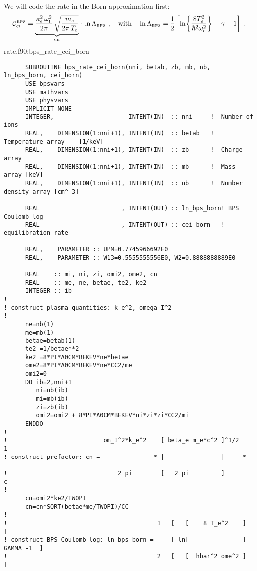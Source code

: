 \documentclass[preprint,12pt,eqsecnum,nofootinbib,amsmath,amssymb]{revtex4}
\newcommand{\smI}{{\rm\scriptscriptstyle I}}
\newcommand{\smBPS}{{\rm\scriptscriptstyle BPS}}
\begin{document}
We will code the rate in the Born approximation first:
\begin{eqnarray}
  {\cal C}_{e\smI}^\smBPS
  = 
  \underbrace{
  \frac{\kappa_e^2\,\omega_\smI^2}{2\pi}\, 
  \sqrt{\frac{m_e}{2\pi\, T_e}}
  }_{\rm cn} \,\cdot\,  \ln\Lambda_\smBPS \ ,
  ~~~\text{with}~~~
  \ln\Lambda_\smBPS
  =
  \frac{1}{2}\left[\ln\!\left\{\frac{8 T_e^2}{\hbar^2 \omega_e^2}
  \right\} - \gamma - 1 \right] \ .
\label{bpsrate_again}
\end{eqnarray}
\vskip0.1cm 
\noindent
rate.f90:bps\_rate\_cei\_born
{
\baselineskip 10pt
\begin{verbatim}
      SUBROUTINE bps_rate_cei_born(nni, betab, zb, mb, nb, ln_bps_born, cei_born)
      USE bpsvars
      USE mathvars
      USE physvars
      IMPLICIT NONE
      INTEGER,                     INTENT(IN)  :: nni     !  Number of ions
      REAL,    DIMENSION(1:nni+1), INTENT(IN)  :: betab   !  Temperature array    [1/keV]
      REAL,    DIMENSION(1:nni+1), INTENT(IN)  :: zb      !  Charge array 
      REAL,    DIMENSION(1:nni+1), INTENT(IN)  :: mb      !  Mass array [keV]
      REAL,    DIMENSION(1:nni+1), INTENT(IN)  :: nb      !  Number density array [cm^-3]

      REAL                       , INTENT(OUT) :: ln_bps_born! BPS Coulomb log 
      REAL                       , INTENT(OUT) :: cei_born   ! equilibration rate

      REAL,    PARAMETER :: UPM=0.7745966692E0
      REAL,    PARAMETER :: W13=0.5555555556E0, W2=0.8888888889E0

      REAL    :: mi, ni, zi, omi2, ome2, cn
      REAL    :: me, ne, betae, te2, ke2
      INTEGER :: ib
!
! construct plasma quantities: k_e^2, omega_I^2
!
      ne=nb(1)
      me=mb(1)
      betae=betab(1)
      te2 =1/betae**2
      ke2 =8*PI*A0CM*BEKEV*ne*betae
      ome2=8*PI*A0CM*BEKEV*ne*CC2/me
      omi2=0
      DO ib=2,nni+1
         ni=nb(ib)
         mi=mb(ib)
         zi=zb(ib)
         omi2=omi2 + 8*PI*A0CM*BEKEV*ni*zi*zi*CC2/mi
      ENDDO
!
!                           om_I^2*k_e^2    [ beta_e m_e*c^2 ]^1/2    1
! construct prefactor: cn = ------------  * |--------------- |     * ---
!                               2 pi        [   2 pi         ]        c
!
      cn=omi2*ke2/TWOPI
      cn=cn*SQRT(betae*me/TWOPI)/CC
!
!                                          1   [   [    8 T_e^2    ]             ]
! construct BPS Coulomb log: ln_bps_born = --- [ ln[ ------------- ] - GAMMA -1  ]
!                                          2   [   [  hbar^2 ome^2 ]             ]


\end{verbatim}}
\end{document}

